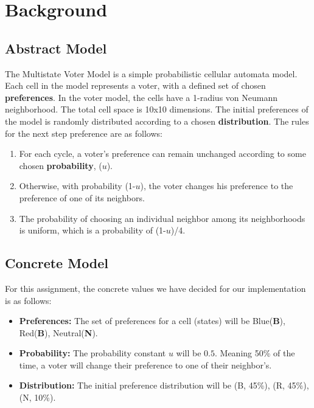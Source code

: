 \documentclass[11pt]{article}
\begin{document}
\section{Background}
    \subsection{Abstract Model}
    The Multistate Voter Model is a simple probabilistic cellular automata model.
    Each cell in the model represents a voter, with a defined set of chosen \textbf{preferences}.
    In the voter model, the cells have a 1-radius von Neumann neighborhood.
    The total cell space is 10x10 dimensions.
    The initial preferences of the model is randomly distributed according to a chosen \textbf{distribution}.
    The rules for the next step preference are as follows:
    \begin{enumerate}
        \item For each cycle, a voter's preference can remain unchanged according to some chosen \textbf{probability}, ($u$).
        \item Otherwise, with probability (1-$u$), the voter changes his preference to the preference of one of its neighbors.
        \item The probability of choosing an individual neighbor among its neighborhoods is uniform, which is a probability of (1-$u$)/4.
    \end{enumerate}

    \subsection{Concrete Model}
    For this assignment, the concrete values we have decided for our implementation is as follows:
    \begin{itemize}
        \item \textbf{Preferences:} The set of preferences for a cell (states)
        will be Blue(\textbf{B}), Red(\textbf{B}), Neutral(\textbf{N}).
        \item \textbf{Probability:} The probability constant $u$ will be $0.5$.
        Meaning 50\% of the time, a voter will change their preference to one of their neighbor's.
        \item \textbf{Distribution:} The initial preference distribution will be (B, 45\%), (R, 45\%), (N, 10\%).
    \end{itemize}
\end{document}
